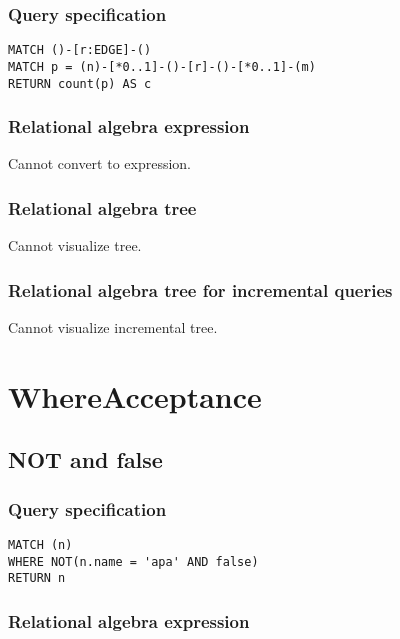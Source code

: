 \subsubsection*{Query specification}

\begin{lstlisting}
MATCH ()-[r:EDGE]-()
MATCH p = (n)-[*0..1]-()-[r]-()-[*0..1]-(m)
RETURN count(p) AS c
\end{lstlisting}

\subsubsection*{Relational algebra expression}

Cannot convert to expression.

\subsubsection*{Relational algebra tree}

Cannot visualize tree.

\subsubsection*{Relational algebra tree for incremental queries}

Cannot visualize incremental tree.

\section{WhereAcceptance}

\subsection{NOT and false}

\subsubsection*{Query specification}

\begin{lstlisting}
MATCH (n)
WHERE NOT(n.name = 'apa' AND false)
RETURN n
\end{lstlisting}

\subsubsection*{Relational algebra expression}

